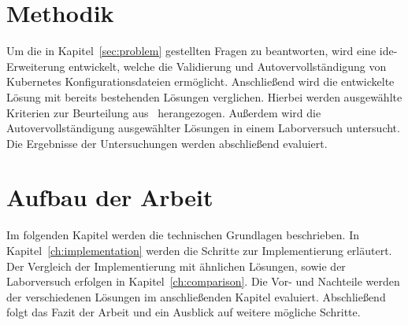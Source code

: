 \section{Methodik}
Um die in Kapitel~\ref{sec:problem} gestellten Fragen zu beantworten, wird eine \acs{ide}-Erweiterung entwickelt, welche die Validierung und Autovervollständigung von
Kubernetes Konfigurationsdateien ermöglicht. Anschließend wird die entwickelte Lösung mit bereits bestehenden Lösungen verglichen.
Hierbei werden ausgewählte Kriterien zur Beurteilung aus~\cite[A Large-Scale Study of Usability Criteria Addressed by Static Analysis Tools]{usability-criteria-static-analysis-tools} herangezogen.
Außerdem wird die Autovervollständigung ausgewählter Lösungen in einem Laborversuch untersucht.
Die Ergebnisse der Untersuchungen werden abschließend evaluiert.

\section{Aufbau der Arbeit}
Im folgenden Kapitel werden die technischen Grundlagen beschrieben. In Kapitel~\ref{ch:implementation} werden die Schritte zur Implementierung erläutert.
Der Vergleich der Implementierung mit ähnlichen Lösungen, sowie der Laborversuch erfolgen in Kapitel~\ref{ch:comparison}.
Die Vor- und Nachteile werden der verschiedenen Lösungen im anschließenden Kapitel evaluiert.
Abschließend folgt das Fazit der Arbeit und ein Ausblick auf weitere mögliche Schritte.